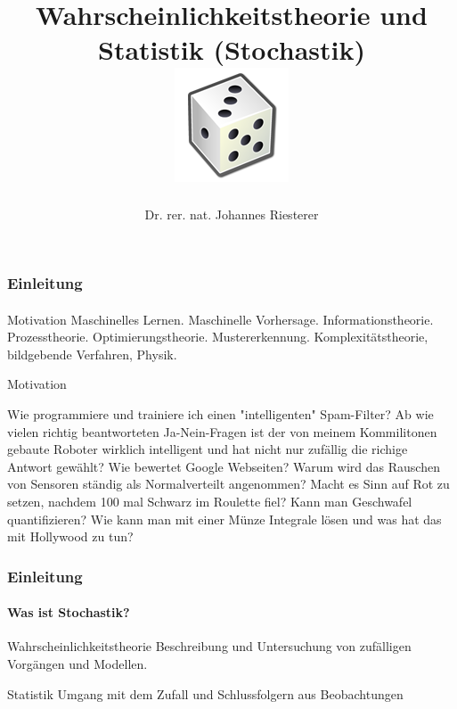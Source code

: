 \documentclass{beamer}
\begin{document}
\title[Stochastik] %
{Wahrscheinlichkeitstheorie und Statistik (Stochastik)
\\
\includegraphics[scale=0.5]{img/craps}
}
\subtitle{}
\author[Dr. Johannes Riesterer] %
{Dr.  rer. nat. Johannes Riesterer}

\date[KPT 2004] %
{}

\subject{Stochastik}

\frame{\titlepage}


\begin{frame}
    \frametitle{Einleitung}
\framesubtitle{}

\begin{block}{Motivation}
Maschinelles Lernen. Maschinelle Vorhersage. Informationstheorie. Prozesstheorie. Optimierungstheorie. Mustererkennung. Komplexitätstheorie, bildgebende Verfahren, Physik.
\end{block}

\begin{block}{Motivation}

Wie programmiere und trainiere ich einen "intelligenten" Spam-Filter?
Ab wie vielen richtig beantworteten Ja-Nein-Fragen ist der  von meinem Kommilitonen gebaute Roboter wirklich intelligent und  hat nicht nur zufällig die richige Antwort gewählt?
Wie bewertet Google Webseiten?
Warum wird das Rauschen von Sensoren ständig als Normalverteilt angenommen?
Macht es Sinn auf Rot zu setzen, nachdem 100 mal Schwarz im Roulette fiel?
Kann man Geschwafel quantifizieren?
Wie kann man mit einer Münze Integrale lösen und was hat das mit Hollywood zu tun? 
\end{block}

 \end{frame}


\begin{frame}
    \frametitle{Einleitung}
\framesubtitle{Was ist Stochastik?}
    \begin{block}{Wahrscheinlichkeitstheorie}
 Beschreibung und Untersuchung von zufälligen Vorgängen und Modellen.
\end{block}
    \begin{block}{Statistik}
Umgang mit dem Zufall und Schlussfolgern aus Beobachtungen
\end{block}
 \end{frame}
\end{document}
